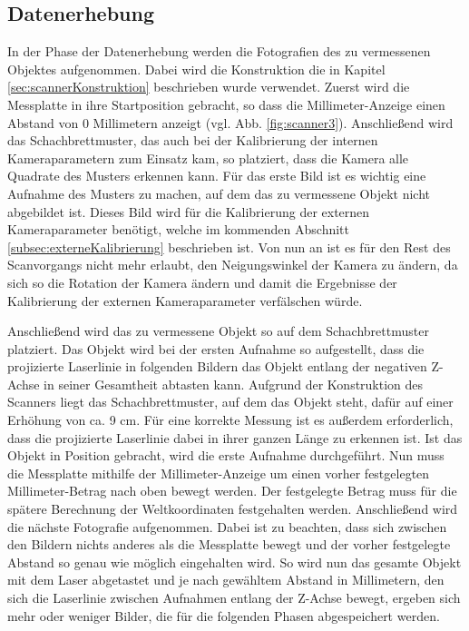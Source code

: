 \subsection{Datenerhebung}
\label{subsec:Datenerhebung}
In der Phase der Datenerhebung werden die Fotografien des zu vermessenen Objektes aufgenommen. Dabei wird die Konstruktion die in Kapitel \ref{sec:scannerKonstruktion} beschrieben wurde verwendet. Zuerst wird die Messplatte in ihre Startposition gebracht, so dass die Millimeter-Anzeige einen Abstand von 0 Millimetern anzeigt (vgl. Abb. \ref{fig:scanner3}). Anschließend wird das Schachbrettmuster, das auch bei der Kalibrierung der internen Kameraparametern zum Einsatz kam, so platziert, dass die Kamera alle Quadrate des Musters erkennen kann. Für das erste Bild ist es wichtig eine Aufnahme des Musters zu machen, auf dem das zu vermessene Objekt nicht abgebildet ist. Dieses Bild wird für die Kalibrierung der externen Kameraparameter benötigt, welche im kommenden Abschnitt \ref{subsec:externeKalibrierung} beschrieben ist. Von nun an ist es für den Rest des Scanvorgangs nicht mehr erlaubt, den Neigungswinkel der Kamera zu ändern, da sich so die Rotation der Kamera ändern und damit die Ergebnisse der Kalibrierung der externen Kameraparameter verfälschen würde.
\bigbreak

Anschließend wird das zu vermessene Objekt so auf dem Schachbrettmuster platziert. Das Objekt wird bei der ersten Aufnahme so aufgestellt, dass die projizierte Laserlinie in folgenden Bildern das Objekt entlang der negativen Z-Achse in seiner Gesamtheit abtasten kann. Aufgrund der Konstruktion des Scanners liegt das Schachbrettmuster, auf dem das Objekt steht, dafür auf einer Erhöhung von ca. 9 cm. Für eine korrekte Messung ist es außerdem erforderlich, dass die projizierte Laserlinie dabei in ihrer ganzen Länge zu erkennen ist. Ist das Objekt in Position gebracht, wird die erste Aufnahme durchgeführt. Nun muss die Messplatte mithilfe der Millimeter-Anzeige um einen vorher festgelegten Millimeter-Betrag nach oben bewegt werden. Der festgelegte Betrag muss für die spätere Berechnung der Weltkoordinaten festgehalten werden. Anschließend wird die nächste Fotografie aufgenommen. Dabei ist zu beachten, dass sich zwischen den Bildern nichts anderes als die Messplatte bewegt und der vorher festgelegte Abstand so genau wie möglich eingehalten wird. So wird nun das gesamte Objekt mit dem Laser abgetastet und je nach gewähltem Abstand in Millimetern, den sich die Laserlinie zwischen Aufnahmen entlang der Z-Achse bewegt, ergeben sich mehr oder weniger Bilder, die für die folgenden Phasen abgespeichert werden.      

